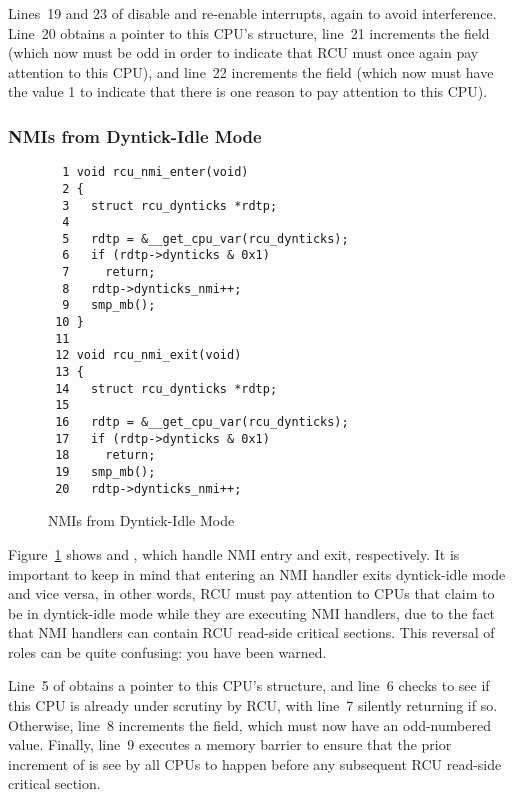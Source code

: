 Lines~19 and 23 of  disable and re-enable interrupts,
again to avoid interference.
Line~20 obtains a pointer to this CPU's  structure,
line~21 increments the  field (which now must be odd
in order to indicate that RCU must once again pay attention to this
CPU), and line~22 increments the  field
(which now must have the value 1 to indicate that there is one
reason to pay attention to this CPU).

\subsubsection{NMIs from Dyntick-Idle Mode}
\label{app:rcuimpl:rcutreewt:NMIs from Dyntick-Idle Mode}

\begin{figure}[tbp]
{ \scriptsize
\begin{verbatim}
  1 void rcu_nmi_enter(void)
  2 {
  3   struct rcu_dynticks *rdtp;
  4
  5   rdtp = &__get_cpu_var(rcu_dynticks);
  6   if (rdtp->dynticks & 0x1)
  7     return;
  8   rdtp->dynticks_nmi++;
  9   smp_mb();
 10 }
 11
 12 void rcu_nmi_exit(void)
 13 {
 14   struct rcu_dynticks *rdtp;
 15
 16   rdtp = &__get_cpu_var(rcu_dynticks);
 17   if (rdtp->dynticks & 0x1)
 18     return;
 19   smp_mb();
 20   rdtp->dynticks_nmi++;
\end{verbatim}
}
\caption{NMIs from Dyntick-Idle Mode}
\label{fig:app:rcuimpl:rcutreewt:NMIs from Dyntick-Idle Mode}
\end{figure}

Figure~\ref{fig:app:rcuimpl:rcutreewt:NMIs from Dyntick-Idle Mode}
shows  and , which handle
NMI entry and exit, respectively.
It is important to keep in mind that entering an NMI handler
exits dyntick-idle mode and vice versa, in other words, RCU must
pay attention to CPUs that claim to be in dyntick-idle mode while
they are executing NMI handlers, due to the fact that NMI handlers
can contain RCU read-side critical sections.
This reversal of roles can be quite confusing: you have been warned.

Line~5 of  obtains a pointer to this CPU's
 structure, and line~6 checks to see if this
CPU is already under scrutiny by RCU, with line~7 silently returning
if so.
Otherwise, line~8 increments the  field, which
must now have an odd-numbered value.
Finally, line~9 executes a memory barrier to ensure that the prior
increment of  is see by all CPUs to happen
before any subsequent RCU read-side critical section.

